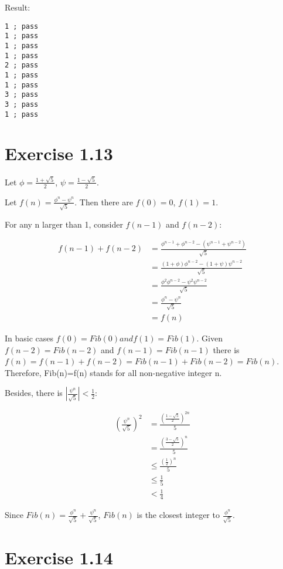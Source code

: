 \documentclass[../main.tex]{subfiles}
\begin{document}
Result:

\begin{lstlisting}
1 ; pass
1 ; pass
1 ; pass
1 ; pass
2 ; pass
1 ; pass
1 ; pass
3 ; pass
3 ; pass
1 ; pass
\end{lstlisting}

\section{Exercise 1.13}

Let $\phi = \frac{1 + \sqrt{5}}{2}$, $\psi = \frac{1 - \sqrt{5}}{2}$.

Let $f(n) = \frac{\phi ^ n - \psi ^ n}{\sqrt{5}}$. Then there are $f(0) = 0$, $f(1) = 1$.

For any n larger than 1, consider $f(n - 1)$ and $f(n - 2)$:

\begin{align*}
f(n-1) + f(n-2) &= \frac{\phi^{n-1} + \phi^{n-2}-(\psi^{n-1}+\psi^{n-2})}{\sqrt{5}} \\
                &= \frac{(1+\phi)\phi^{n-2}-(1+\psi)\psi^{n-2}}{\sqrt{5}} \\
                &= \frac{\phi^2\phi^{n-2}-\psi^2\psi^{n-2}}{\sqrt{5}} \\
                &= \frac{\phi^n-\psi^n}{\sqrt{5}} \\
                &= f(n)
\end{align*}

In basic cases $f(0)=Fib(0) and f(1)=Fib(1)$. Given $f(n-2)=Fib(n-2)$ and
 $f(n-1)=Fib(n-1)$ there is
 $f(n)=f(n-1)+f(n-2)=Fib(n-1)+Fib(n-2)=Fib(n)$. Therefore, Fib(n)=f(n)
 stands for all non-negative integer n.

Besides, there is $\left|\frac{\psi^n}{\sqrt{5}}\right|<\frac{1}{2}$:

\begin{align*}
\left({\frac{\psi^n}{\sqrt{5}}}\right)^2 &= \frac{\left({\frac{1-\sqrt{5}}{2}}\right)^{2n}}{5} \\
&= \frac{\left({\frac{3-\sqrt{5}}{2}}\right)^{n}}{5} \\
&\leq \frac{\left(\frac{1}{2}\right)^n}{5} \\
&\leq \frac{1}{5} \\
&< \frac{1}{4}
\end{align*}

Since $Fib(n)=\frac{\phi^n}{\sqrt{5}}+\frac{\psi^n}{\sqrt{5}}$, $Fib(n)$ is the closest
 integer to $\frac{\phi^n}{\sqrt{5}}$.

\section{Exercise 1.14}
\end{document}
